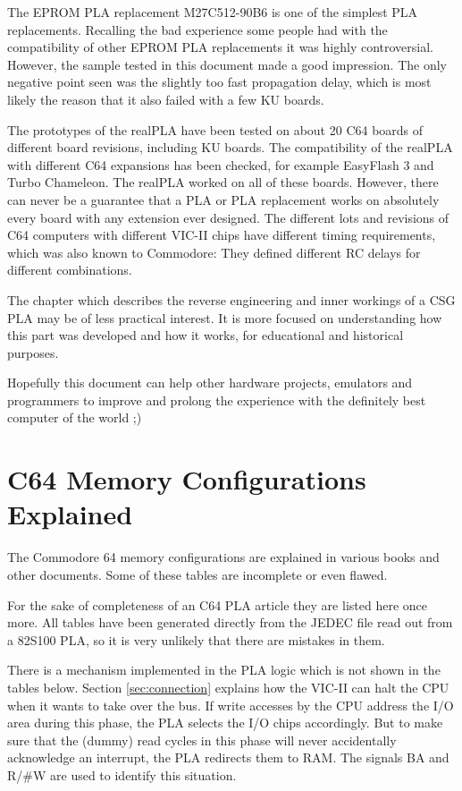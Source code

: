 The EPROM PLA replacement M27C512-90B6 is one of the simplest PLA
replacements. Recalling the bad experience some people had with the
compatibility of other EPROM PLA replacements it was highly controversial.
However, the sample tested in this document made a good impression. The only
negative point seen was the slightly too fast propagation delay, which is
most likely the reason that it also failed with a few KU boards.

The prototypes of the realPLA have been tested on about 20 C64 boards of
different board revisions, including KU boards. The compatibility of the
realPLA with different C64 expansions has been checked, for example
EasyFlash 3 and Turbo Chameleon. The realPLA worked on all of these boards.
However, there can never be a guarantee that a PLA or PLA replacement works
on absolutely every board with any extension ever designed. The different
lots and revisions of C64 computers with different VIC-II chips have
different timing requirements, which was also known to Commodore: They
defined different RC delays for different combinations.

The chapter which describes the reverse engineering and inner workings of a
CSG PLA may be of less practical interest. It is more focused on
understanding how this part was developed and how it works, for educational
and historical purposes.

Hopefully this document can help other hardware projects, emulators and
programmers to improve and prolong the experience with the definitely best
computer of the world ;)


\appendix

\chapter{C64 Memory Configurations Explained}
\label{sec:memmaps}

The Commodore 64 memory configurations are explained in various books and
other documents. Some of these tables are incomplete or even flawed.

For the sake of completeness of an C64 PLA article they are listed here once
more. All tables have been generated directly from the JEDEC file read out
from a 82S100 PLA, so it is very unlikely that there are mistakes in them.

There is a mechanism implemented in the PLA logic which is not shown in the
tables below. Section \ref{sec:connection} explains how
the VIC-II can halt the CPU when it wants to take over the bus. If write
accesses by the CPU address the I/O area during this phase, the PLA selects the
I/O chips accordingly. But to make sure that the (dummy) read cycles in this
phase will never accidentally acknowledge an interrupt, the PLA redirects them
to RAM. The signals BA and R/\#W are used to identify this situation.

